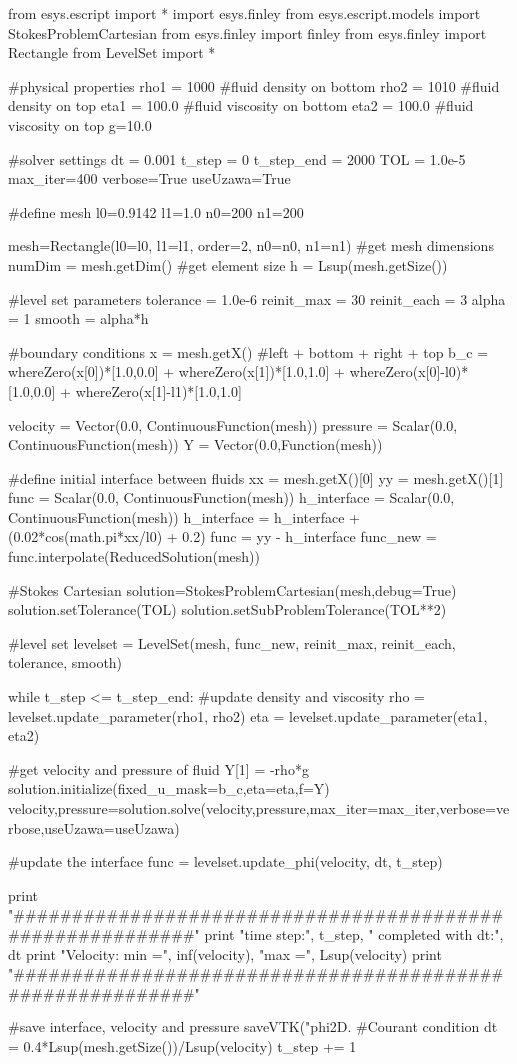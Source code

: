 \begin{python}

from esys.escript import *
import esys.finley
from esys.escript.models import StokesProblemCartesian
from esys.finley import finley
from esys.finley import Rectangle
from LevelSet import *

#physical properties
rho1 = 1000		#fluid density on bottom
rho2 = 1010		#fluid density on top
eta1 = 100.0		#fluid viscosity on bottom
eta2 = 100.0		#fluid viscosity on top
g=10.0

#solver settings
dt = 0.001
t_step = 0
t_step_end = 2000
TOL = 1.0e-5
max_iter=400
verbose=True
useUzawa=True

#define mesh
l0=0.9142
l1=1.0
n0=200      
n1=200

mesh=Rectangle(l0=l0, l1=l1, order=2, n0=n0, n1=n1)
#get mesh dimensions
numDim = mesh.getDim()
#get element size
h = Lsup(mesh.getSize())

#level set parameters
tolerance = 1.0e-6
reinit_max = 30
reinit_each = 3
alpha = 1
smooth = alpha*h 

#boundary conditions
x = mesh.getX()
#left + bottom + right + top
b_c = whereZero(x[0])*[1.0,0.0] + whereZero(x[1])*[1.0,1.0] + whereZero(x[0]-l0)*[1.0,0.0] + whereZero(x[1]-l1)*[1.0,1.0]

velocity = Vector(0.0, ContinuousFunction(mesh))
pressure = Scalar(0.0, ContinuousFunction(mesh))
Y = Vector(0.0,Function(mesh))

#define initial interface between fluids
xx = mesh.getX()[0]
yy = mesh.getX()[1]
func = Scalar(0.0, ContinuousFunction(mesh))
h_interface = Scalar(0.0, ContinuousFunction(mesh))
h_interface = h_interface + (0.02*cos(math.pi*xx/l0) + 0.2)
func = yy - h_interface
func_new = func.interpolate(ReducedSolution(mesh))

#Stokes Cartesian
solution=StokesProblemCartesian(mesh,debug=True)
solution.setTolerance(TOL)
solution.setSubProblemTolerance(TOL**2)

#level set
levelset = LevelSet(mesh, func_new, reinit_max, reinit_each, tolerance, smooth)    

while t_step <= t_step_end:
  #update density and viscosity
  rho = levelset.update_parameter(rho1, rho2)
  eta = levelset.update_parameter(eta1, eta2)

  #get velocity and pressure of fluid
  Y[1] = -rho*g
  solution.initialize(fixed_u_mask=b_c,eta=eta,f=Y)
  velocity,pressure=solution.solve(velocity,pressure,max_iter=max_iter,verbose=verbose,useUzawa=useUzawa)
  
  #update the interface
  func = levelset.update_phi(velocity, dt, t_step)  

  print "##########################################################"
  print "time step:", t_step, " completed with dt:", dt
  print "Velocity: min =", inf(velocity), "max =", Lsup(velocity)
  print "##########################################################"
 
  #save interface, velocity and pressure 
  saveVTK("phi2D.%
  #Courant condition
  dt = 0.4*Lsup(mesh.getSize())/Lsup(velocity)
  t_step += 1

\end{python}
